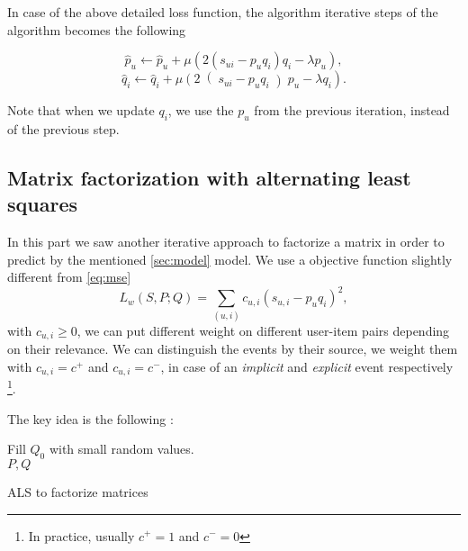In case of the above detailed loss function, the algorithm iterative steps of the algorithm 
becomes the following

\[ \hat{p}_{u}\leftarrow \hat{p}_{u}+\mu \left(2\left(s_{ui}-p_u q_i\right) q_i - \lambda p_u\right),\]
\[\hat{q}_{i}\leftarrow \hat{q}_{i}+\mu \left(2\right(s_{ui}-p_u q_i\left)p_u - \lambda q_i\right) .\]

Note that when we update $q_i$, we use the $p_u$ from the previous iteration, instead of
the previous step.

\subsection{Matrix factorization with alternating least squares}

In this part we saw another iterative approach to factorize a matrix in order to predict by the mentioned
\ref{sec:model} model. We use a objective function slightly different from \ref{eq:mse}
\[ L_{w}(S,P;Q)=\sum_{(u,i)}c_{u,i}(s_{u,i}-p_{u}q_{i})^2, \]
with $c_{u,i}\geq0$, we can put different weight on different user-item pairs depending on their relevance.
We can distinguish the events by their source, we weight them with $c_{u,i}=c^+$ and $c_{u,i}=c^-$, in
case of  an \emph{implicit} and \emph{explicit} event respectively \footnote{In practice, usually 
$c^{+}=1$ and $c^{-}=0$}. 

The key idea is the following \cite{takacs2012alternating}:

\begin{algorithm}[H]
    Fill $Q_0$ with small random values. \\
  \Return $P,Q$
  \caption{ALS to factorize matrices}
\end{algorithm}
